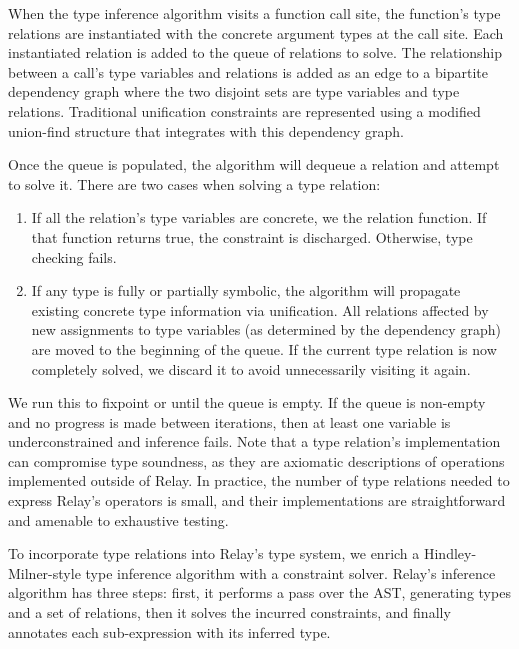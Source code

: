   When the type inference algorithm visits a function call site, the function's type relations are
    instantiated with the concrete argument types at the call site.
  Each instantiated relation is added to the queue of relations to solve.
  The relationship between a call's type variables and relations is added as an edge to
    a bipartite dependency graph where the two disjoint sets are type variables and type relations.
  Traditional unification constraints are represented using a modified union-find structure that
    integrates with this dependency graph.

  Once the queue is populated, the algorithm will dequeue a relation and attempt to solve it.
  There are two cases when solving a type relation:
  \begin{enumerate}
    \item If all the relation's type variables
    are concrete, we the relation function. If that function returns true, the
    constraint is discharged. Otherwise, type checking fails.
    \item If any type is fully or partially symbolic, the
      algorithm will propagate
      existing concrete type information via unification.
    All relations affected by new assignments to type
      variables (as determined by the dependency graph)
      are moved to the beginning of the queue.
    If the current type relation is now completely solved, we
    discard it to avoid unnecessarily visiting it again.
  \end{enumerate}

  We run this to fixpoint or until the queue is empty.
  If the queue is non-empty and no progress is made between iterations,
    then at least one variable is underconstrained and inference fails.
  Note that a type relation's implementation can
    compromise type soundness, as they are axiomatic descriptions
    of operations implemented outside of Relay.
  In practice, the number of type relations needed to express Relay's
    operators is small, and their implementations are straightforward
    and amenable to exhaustive testing.

    To incorporate type relations into Relay's type system, we enrich
      a Hindley-Milner-style type inference algorithm with
      a constraint solver.
    Relay's inference algorithm has three steps: first, it
      performs a pass over the AST, generating types and a set of relations,
      then it solves the incurred constraints,
      and finally annotates each sub-expression with its inferred type.

